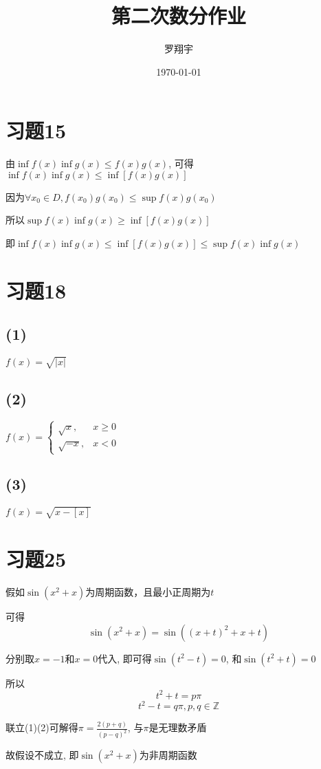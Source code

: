 \documentclass[a4paper,11pt]{article}
\title{第二次数分作业}
\author{罗翔宇}
\date{\today}
\begin{document}
\maketitle

\section*{习题15}
由$\inf f(x) \inf g(x) \le f(x)g(x)$, 可得$\inf f(x) \inf g(x) \le \inf [f(x)g(x)]$

因为$\forall x_0 \in D, f(x_0)g(x_0) \le \sup f(x) g(x_0)$

所以$\sup f(x) \inf g(x) \ge \inf[f(x)g(x)]$

即$\inf f(x) \inf g(x) \le \inf[f(x)g(x)] \le \sup f(x) \inf g(x)$
\section*{习题18}
\subsection*{(1)}
$f(x)=\sqrt{|x|}$
\subsection*{(2)}
$f(x)=
\begin{cases}
	\sqrt{x},&x \ge 0\\
	\sqrt{-x},&x < 0
\end{cases}$
\subsection*{(3)}
$f(x)=\sqrt{x - [x]}$
\section*{习题25}
假如$\sin (x^2+x)$为周期函数，且最小正周期为$t$

可得 $$\sin(x^2+x) = \sin((x+t)^2+x+t)$$

分别取$x=-1$和$x=0$代入, 即可得$\sin (t^2-t)=0$, 和$\sin (t^2+t)=0$

所以
\begin{equation}
t^2+t=p\pi
\end{equation}
\begin{equation}
t^2-t=q\pi, p, q\in\mathbb{Z}
\end{equation}

联立(1)(2)可解得$\pi=\frac{2(p+q)}{(p-q)^2}$, 与$\pi$是无理数矛盾

故假设不成立, 即$\sin (x^2+x)$为非周期函数
\end{document}
